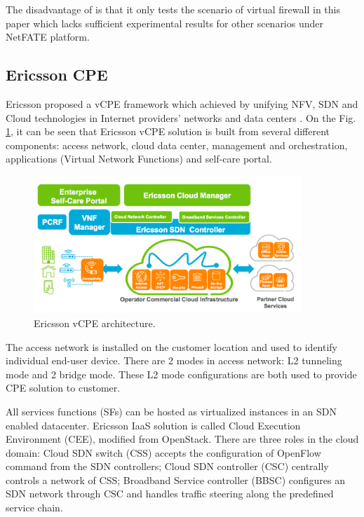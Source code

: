 The disadvantage of \cite{netfate} is that it only tests the scenario of virtual firewall in this paper which lacks sufficient experimental results for other scenarios under NetFATE platform.




\subsection{Ericsson CPE}
Ericsson proposed a vCPE framework which achieved by unifying NFV, SDN and Cloud technologies in Internet providers’ networks and data centers \cite{ericsson-vcpe}.
On the Fig. \ref{fig:ericsson_archi}, it can be seen that Ericsson vCPE solution is built from several different components: access network, cloud data center, management and orchestration, applications (Virtual Network Functions) and self-care portal.

\begin{figure}[!t]
\centering
\includegraphics[width=0.9\textwidth]{./fig/ericsson_archi.png}
\caption{Ericsson vCPE architecture. \cite{ericsson-vcpe}}
\label{fig:ericsson_archi}
\end{figure}

The access network is installed on the customer location and used to identify individual end-user device.
There are 2 modes in access network: L2 tunneling mode and 2 bridge mode.
These L2 mode configurations are both used to provide CPE solution to customer.

All services functions (SFs) can be hosted as virtualized instances in an SDN enabled datacenter.
Ericsson IaaS solution is called Cloud Execution Environment (CEE), modified from OpenStack.
There are three roles in the cloud domain:
Cloud SDN switch (CSS) accepts the configuration of OpenFlow command from the SDN controllers;
Cloud SDN controller (CSC) centrally controls a network of CSS;
Broadband Service controller (BBSC) configures an SDN network through CSC and handles traffic steering along the predefined service chain.

